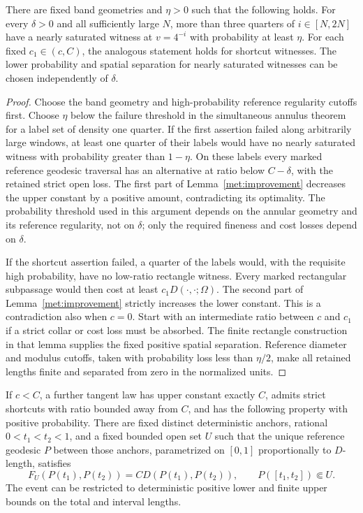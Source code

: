 \begin{lemma}
\label{met:extremal-labels}
There are fixed band geometries and $\eta>0$ such that the following
holds.  For every $\delta>0$ and all sufficiently large $N$, more than
three quarters of $i\in[N,2N]$ have a nearly saturated witness at
$v=4^{-i}$ with probability at least $\eta$.  For each fixed
$c_1\in(c,C)$, the analogous statement holds for shortcut witnesses.
The lower probability and spatial separation for nearly saturated
witnesses can be chosen independently of $\delta$.
\end{lemma}

\begin{proof}
Choose the band geometry and high-probability reference regularity
cutoffs first.  Choose $\eta$ below the failure threshold in the
simultaneous annulus theorem for a label set of density one quarter.
If the first assertion failed along arbitrarily large windows, at
least one quarter of their labels would have no nearly saturated
witness with probability greater than $1-\eta$.  On these labels every
marked reference geodesic traversal has an alternative at ratio below
$C-\delta$, with the retained strict open loss.  The first part of
Lemma~\ref{met:improvement} decreases the upper constant by a positive
amount, contradicting its optimality.  The probability threshold used
in this argument depends on the annular geometry and its reference
regularity, not on $\delta$; only the required fineness and cost losses
depend on $\delta$.

If the shortcut assertion failed, a quarter of the labels would, with
the requisite high probability, have no low-ratio rectangle witness.
Every marked rectangular subpassage would then cost at least
$c_1D(\cdot,\cdot;\Omega)$.  The second part of
Lemma~\ref{met:improvement} strictly increases the lower constant.
This is a contradiction also when $c=0$.  Start with an intermediate
ratio between $c$ and $c_1$ if a strict collar or cost loss must be
absorbed.  The finite rectangle construction in that lemma supplies
the fixed positive spatial separation.  Reference diameter and
modulus cutoffs, taken with probability loss less than $\eta/2$, make
all retained lengths finite and separated from zero in the normalized
units.
\end{proof}

\begin{lemma}
\label{met:dense-anchors}
If $c<C$, a further tangent law has upper constant exactly $C$,
admits strict shortcuts with ratio bounded away from $C$, and has the
following property with positive probability.  There are fixed
distinct deterministic anchors, rational $0<t_1<t_2<1$, and a fixed
bounded open set $U$ such that the unique reference geodesic $P$
between those anchors, parametrized on $[0,1]$ proportionally to
$D$-length, satisfies
\begin{equation}
 F_U(P(t_1),P(t_2))
   =C D(P(t_1),P(t_2)),\qquad P([t_1,t_2])\Subset U.
 \label{met:saturated}
\end{equation}
The event can be restricted to deterministic positive lower and
finite upper bounds on the total and interval lengths.
\end{lemma}

